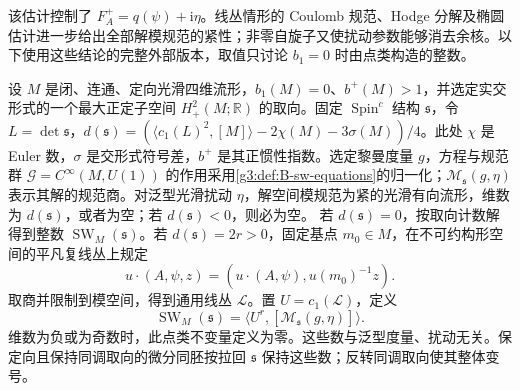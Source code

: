 该估计控制了 \(F_A^+=q(\psi)+\mathrm i\eta\)。线丛情形的 Coulomb 规范、Hodge 分解及椭圆估计进一步给出全部解模规范的紧性；非零自旋子又使扰动参数能够消去余核。以下使用这些结论的完整外部版本，取值只讨论 \(b_1=0\) 时由点类构造的整数。

\begin{theorem}\label{g3:thm:B-sw-invariant}
 设 \(M\) 是闭、连通、定向光滑四维流形，\(b_1(M)=0\)、\(b^+(M)>1\)，并选定实交形式的一个最大正定子空间 \(H^2_+(M;\mathbb R)\) 的取向。固定 \(\operatorname{Spin}^c\) 结构 \(\mathfrak s\)，令 \(L=\det\mathfrak s\)，\(d(\mathfrak s)=(\langle c_1(L)^2,[M]\rangle-2\chi(M)-3\sigma(M))/4\)。此处 \(\chi\) 是 Euler 数，\(\sigma\) 是交形式符号差，\(b^+\) 是其正惯性指数。选定黎曼度量 \(g\)，方程与规范群 \(\mathcal G=C^\infty(M,U(1))\) 的作用采用\cref{g3:def:B-sw-equations}的归一化；\(\mathcal M_{\mathfrak s}(g,\eta)\) 表示其解的规范商。对泛型光滑扰动 \(\eta\)，解空间模规范为紧的光滑有向流形，维数为 \(d(\mathfrak s)\)，或者为空；若 \(d(\mathfrak s)<0\)，则必为空。
 \ProseParagraphBreak
 若 \(d(\mathfrak s)=0\)，按取向计数解得到整数
 \(\operatorname{SW}_M(\mathfrak s)\)。若 \(d(\mathfrak s)=2r>0\)，固定基点 \(m_0\in M\)，在不可约构形空间的平凡复线丛上规定
 \[
 u\cdot(A,\psi,z)=(u\cdot(A,\psi),u(m_0)^{-1}z).
 \]
 取商并限制到模空间，得到通用线丛 \(\mathcal L\)。置 \(U=c_1(\mathcal L)\)，定义
 \[
 \operatorname{SW}_M(\mathfrak s)
 =\langle U^r,[\mathcal M_{\mathfrak s}(g,\eta)]\rangle.
 \]
 维数为负或为奇数时，此点类不变量定义为零。这些数与泛型度量、扰动无关。保定向且保持同调取向的微分同胚按拉回 \(\mathfrak s\) 保持这些数；反转同调取向使其整体变号。
\end{theorem}

